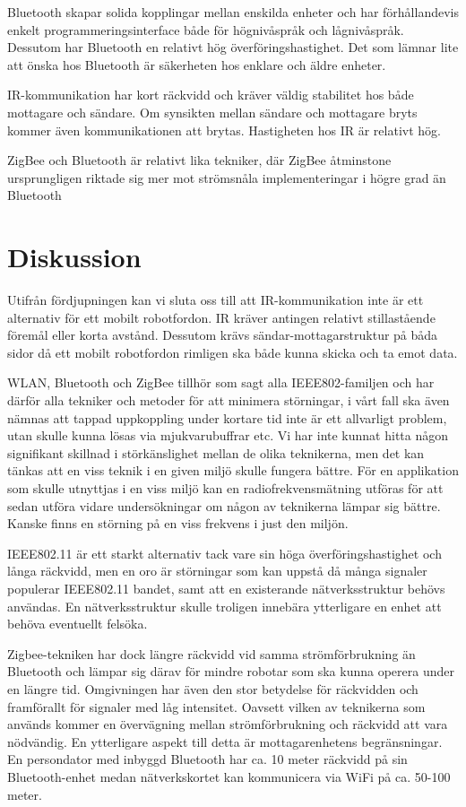 \documentclass[a4paper,12pt,fleqn]{article}
\begin{document}
Bluetooth skapar solida kopplingar mellan enskilda enheter och har förhållandevis enkelt programmeringsinterface både för högnivåspråk och lågnivåspråk. Dessutom har Bluetooth en relativt hög överföringshastighet. Det som lämnar lite att önska hos Bluetooth är säkerheten hos enklare och äldre enheter.

IR-kommunikation har kort räckvidd och kräver väldig stabilitet hos både mottagare och sändare. Om synsikten mellan sändare och mottagare bryts kommer även kommunikationen att brytas. Hastigheten hos IR är relativt hög. 

ZigBee och Bluetooth är relativt lika tekniker, där ZigBee åtminstone ursprungligen riktade sig mer mot strömsnåla implementeringar i högre grad än Bluetooth

\section{Diskussion}
Utifrån fördjupningen kan vi sluta oss till att IR-kommunikation inte är ett alternativ för ett mobilt robotfordon. IR kräver antingen relativt stillastående föremål eller korta avstånd. Dessutom krävs sändar-mottagarstruktur på båda sidor då ett mobilt robotfordon rimligen ska både kunna skicka och ta emot data.

WLAN, Bluetooth och ZigBee tillhör som sagt alla IEEE802-familjen och har därför alla tekniker och metoder för att minimera störningar, i vårt fall ska även nämnas att tappad uppkoppling under kortare tid inte är ett allvarligt problem, utan skulle kunna lösas via mjukvarubuffrar etc. Vi har inte kunnat hitta någon signifikant skillnad i störkänslighet mellan de olika teknikerna, men det kan tänkas att en viss teknik i en given miljö skulle fungera bättre. För en applikation som skulle utnyttjas i en viss miljö kan en radiofrekvensmätning utföras för att sedan utföra vidare undersökningar om någon av teknikerna lämpar sig bättre. Kanske finns en störning på en viss frekvens i just den miljön.

IEEE802.11 är ett starkt alternativ tack vare sin höga överföringshastighet och långa räckvidd, men en oro är störningar som kan uppstå då många signaler populerar IEEE802.11 bandet, samt att en existerande nätverksstruktur behövs användas. En nätverksstruktur skulle troligen innebära ytterligare en enhet att behöva eventuellt felsöka.

Zigbee-tekniken har dock längre räckvidd vid samma strömförbrukning än Bluetooth och lämpar sig därav för mindre robotar som ska kunna operera under en längre tid. Omgivningen har även den stor betydelse för räckvidden och framförallt för signaler med låg intensitet. Oavsett vilken av teknikerna som används kommer en övervägning mellan strömförbrukning och räckvidd att vara nödvändig. En ytterligare aspekt till detta är mottagarenhetens begränsningar. En persondator med inbyggd Bluetooth har ca. 10 meter räckvidd på sin Bluetooth-enhet medan nätverkskortet kan kommunicera via WiFi på ca. 50-100 meter. 
\end{document}
